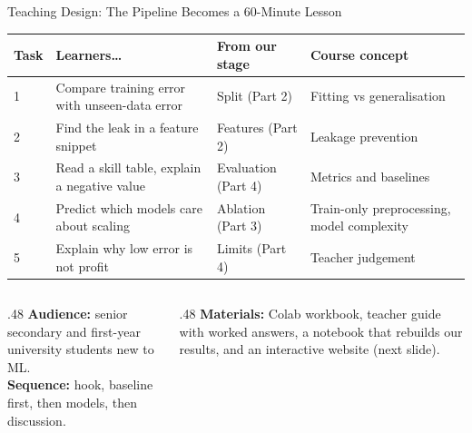 \documentclass[aspectratio=169,11pt]{beamer}
\newcommand{\currentspeaker}{}
\newcommand{\speaker}[1]{\gdef\currentspeaker{#1}}
\newcommand{\repourl}{https://github.com/Steven-ZYC/INT4096-ML-Financial-Forecasting}
\newcommand{\currentrepolink}{}
\newcommand{\repolink}[2]{\gdef\currentrepolink{%
  \href{\repourl/#1/main/#2}{\color{accent}GitHub: \texttt{\detokenize{#2}}}}}
\begin{document}
\begin{frame}{Teaching Design: The Pipeline Becomes a 60-Minute Lesson}
  \repolink{tree}{deliverables/lesson}
  \speaker{Lau Pak Hei}
  \centering\scriptsize
  \renewcommand{\arraystretch}{1.25}
  \begin{tabular}{@{}l>{\raggedright\arraybackslash}p{.27\linewidth}>{\raggedright\arraybackslash}p{.22\linewidth}>{\raggedright\arraybackslash}p{.24\linewidth}@{}}
    \toprule
    \textbf{Task} & \textbf{Learners\ldots} & \textbf{From our stage} & \textbf{Course concept} \\
    \midrule
    1 & Compare training error with unseen-data error & Split (Part 2) & Fitting vs generalisation \\
    2 & Find the leak in a feature snippet & Features (Part 2) & Leakage prevention \\
    3 & Read a skill table, explain a negative value & Evaluation (Part 4) & Metrics and baselines \\
    4 & Predict which models care about scaling & Ablation (Part 3) & Train-only preprocessing, model complexity \\
    5 & Explain why low error is not profit & Limits (Part 4) & Teacher judgement \\
    \bottomrule
  \end{tabular}
  \par\vspace{3mm}
  \begin{columns}[T,onlytextwidth]
    \begin{column}{.48\textwidth}
      \footnotesize
      \textbf{Audience:} senior secondary and first-year university students new to ML.\\
      \textbf{Sequence:} hook, baseline first, then models, then discussion.
    \end{column}
    \begin{column}{.48\textwidth}
      \footnotesize
      \textbf{Materials:} Colab workbook, teacher guide with worked answers, a notebook that
      rebuilds our results, and an interactive website (next slide).
    \end{column}
  \end{columns}
\end{frame}
\end{document}
